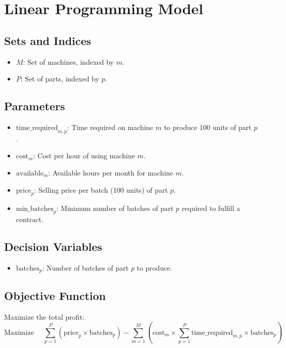 \documentclass{article}
\begin{document}
\section*{Linear Programming Model}

\subsection*{Sets and Indices}
\begin{itemize}
    \item \( M \): Set of machines, indexed by \( m \).
    \item \( P \): Set of parts, indexed by \( p \).
\end{itemize}

\subsection*{Parameters}
\begin{itemize}
    \item \( \text{time\_required}_{m,p} \): Time required on machine \( m \) to produce 100 units of part \( p \).
    \item \( \text{cost}_{m} \): Cost per hour of using machine \( m \).
    \item \( \text{available}_{m} \): Available hours per month for machine \( m \).
    \item \( \text{price}_{p} \): Selling price per batch (100 units) of part \( p \).
    \item \( \text{min\_batches}_{p} \): Minimum number of batches of part \( p \) required to fulfill a contract.
\end{itemize}

\subsection*{Decision Variables}
\begin{itemize}
    \item \( \text{batches}_{p} \): Number of batches of part \( p \) to produce.
\end{itemize}

\subsection*{Objective Function}
Maximize the total profit:
\[
\text{Maximize } \quad \sum_{p=1}^{P} \left( \text{price}_{p} \times \text{batches}_{p} \right) - \sum_{m=1}^{M} \left( \text{cost}_{m} \times \sum_{p=1}^{P} \text{time\_required}_{m,p} \times \text{batches}_{p} \right)
\]
\end{document}
